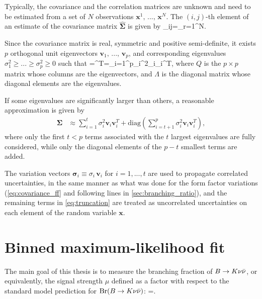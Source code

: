 Typically, the covariance and the correlation matrices are unknown and need to be estimated from a set of $N$ observations $\mathbf{x}^1,\,...,\,\mathbf{x}^N$.
The $(i,j)$-th element of an estimate of the covariance matrix $\mathbf{\hat{\Sigma}}$ is given by 
\be \label{eq:covariance_estimate}
\hat{\Sigma}_{ij}=\sum_{r=1}^{N}.
\ee

Since the covariance matrix is real, symmetric and positive semi-definite, it exists $p$ orthogonal unit eigenvectors $\mathbf{v}_1,\,...,\,\mathbf{v}_p$, and corresponding eigenvalues $\sigma_1^2\ge...\ge\sigma_p^2\ge0$ such that
\be
\mathbf{\Sigma}=\mathbf{\Lambda}^T=\sum_{i=1}^p\sigma_i^2_i_i^T,
\ee
where $Q$ is the $p\times p$ matrix whose columns are the eigenvectors, and $\Lambda$ is the diagonal matrix whose diagonal elements are the eigenvalues.

If some eigenvalues are significantly larger than others, a reasonable approximation is given by
\begin{align} \label{eq:truncation}
\mathbf{\Sigma}&\approx\sum_{i=1}^t\sigma_i^2\mathbf{v}_i\mathbf{v}_i^T+\mathrm{diag}\left(\sum_{i=t+1}^p\sigma_i^2\mathbf{v}_i\mathbf{v}_i^T\right),
\end{align}
where only the first $t<p$ terms associated with the $t$ largest eigenvalues are fully considered, while only the diagonal elements of the $p-t$ smallest terms are added.

The variation vectors $\boldsymbol{\sigma}_i\equiv\sigma_i\,\boldsymbol{v}_i$ for $i=1,...,t$ are used to propagate correlated uncertainties, in the same manner as what was done for the form factor variations (\cref{eq:covariance_ff} and following lines in \cref{sec:branching_ratio}), and the remaining terms in \cref{eq:truncation} are treated as uncorrelated uncertainties on each element of the random variable $\mathbf{x}$.
\section{Binned maximum-likelihood fit} \label{sec:da_pyhf}
The main goal of this thesis is to measure the branching fraction of $B\rightarrow K\nu\bar{\nu}$, or equivalently, the signal strength $\mu$ defined as a factor with respect to the standard model prediction for $\mathrm{Br}(B\rightarrow K\nu\bar{\nu})$:
\be \label{eq:mu}
\mu=.
\ee

